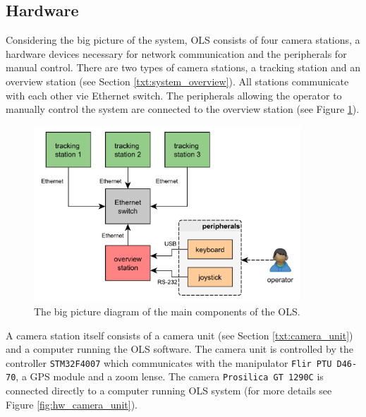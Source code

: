 \subsection{Hardware}

Considering the big picture of the system, OLS consists of four camera stations, a hardware devices necessary for network communication and the peripherals for manual control. There are two types of camera stations, a tracking station and an overview station (see Section \ref{txt:system_overview}). All stations communicate with each other vie Ethernet switch. The peripherals allowing the operator to manually control the system are connected to the overview station (see Figure \ref{fig:hw_ols}).

\begin{figure}[htb]
	\centering
	\includegraphics[width=10cm]{fig/hw_ols.pdf}
	\caption{The big picture diagram of the main components of the OLS.}
	\label{fig:hw_ols}
\end{figure}

A camera station itself consists of a camera unit (see Section \ref{txt:camera_unit}) and a computer running the OLS software. The camera unit is controlled by the controller \texttt{STM32F4007} which communicates with the manipulator \texttt{Flir PTU D46-70}, a GPS module and a zoom lense. The camera \texttt{Prosilica GT 1290C} is connected directly to a computer running OLS system (for more details see Figure \ref{fig:hw_camera_unit}).


